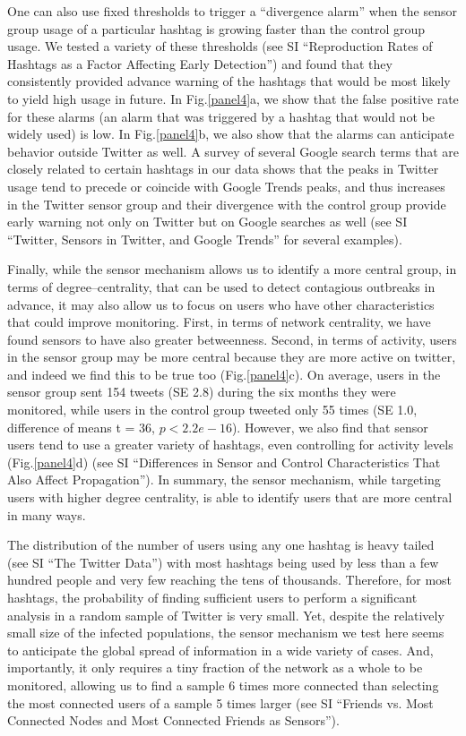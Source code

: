 One can also use fixed thresholds to trigger a ``divergence alarm'' when the sensor group usage of a particular hashtag is growing faster than the control group usage.  We tested a variety of these thresholds (see SI ``Reproduction Rates of Hashtags as a Factor Affecting Early Detection'') and found that they consistently provided advance warning of the hashtags that would be most likely to yield high usage in future.  In Fig.\ref{panel4}a, we show that the false positive rate for these alarms (an alarm that was triggered by a hashtag that would not be widely used) is low.  In Fig.\ref{panel4}b, we also show that the alarms can anticipate behavior outside Twitter as well.  A survey of several Google search terms that are closely related to certain hashtags in our data shows that the peaks in Twitter usage tend to precede or coincide with Google Trends peaks, and thus increases in the Twitter sensor group and their divergence with the control group provide early warning not only on Twitter but on Google searches as well (see SI ``Twitter, Sensors in Twitter, and Google Trends'' for several examples).

Finally, while the sensor mechanism allows us to identify a more central group, in terms of degree--centrality, that can be used to detect contagious outbreaks in advance, it may also allow us to focus on users who have other characteristics that could improve monitoring.  First, in terms of network centrality, we have found sensors to have also greater betweenness. Second, in terms of activity, users in the sensor group may be more central because they are more active on twitter, and indeed we find this to be true too (Fig.\ref{panel4}c).  On average, users in the sensor group sent 154 tweets (SE 2.8) during the six months they were monitored, while users in the control group tweeted only 55 times (SE 1.0, difference of means t = 36, $p < 2.2e-16$).  However, we also find that sensor users tend to use a greater variety of hashtags, even controlling for activity levels (Fig.\ref{panel4}d) (see SI ``Differences in Sensor and Control Characteristics That Also Affect  Propagation''). In summary, the sensor mechanism, while targeting users with higher degree centrality, is able to identify users that are more central in many ways. 

The distribution of the number of users using any one hashtag is heavy tailed (see SI ``The Twitter Data'') with most hashtags being used by less than a few hundred people and very few reaching the tens of thousands.  Therefore, for most hashtags, the probability of finding sufficient users to perform a significant analysis in a random sample of Twitter is very small.  Yet, despite the relatively small size of the infected populations, the sensor mechanism we test here seems to anticipate the global spread of information in a wide variety of cases.  And, importantly, it only requires a tiny fraction of the network as a whole to be monitored, allowing us to find a sample 6 times more connected than selecting the most connected users of a sample 5 times larger (see SI ``Friends vs. Most Connected Nodes and Most Connected Friends as Sensors'').

